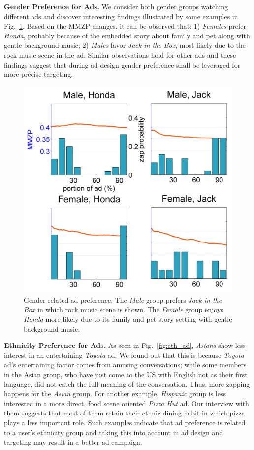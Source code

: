 \documentclass[twoside,leqno,twocolumn]{article}
\begin{document}
\noindent \textbf{Gender Preference for Ads.} We consider both gender groups watching different ads and discover interesting findings illustrated by some examples in Fig.~\ref{fig:ad_gend}. Based on the MMZP changes, it can be observed that: 1) \textit{Females} prefer \textit{Honda}, probably because of the embedded story about family and pet along with gentle background music; 2) \textit{Males} favor \textit{Jack in the Box}, most likely due to the rock music scene in the ad. Similar observations hold for other ads and these findings suggest that during ad design gender preference shall be leveraged for more precise targeting. 

\begin{figure}[h]
	\centering
		\includegraphics[width=.8\columnwidth]{fig/ad_gend.png}
	\caption{Gender-related ad preference. The \textit{Male} group prefers \textit{Jack in the Box} in which rock music scene is shown. The \textit{Female} group enjoys \textit{Honda} more likely due to its family and pet story setting with gentle background music.}
	\label{fig:ad_gend}
\end{figure}

\noindent \textbf{Ethnicity Preference for Ads.} As seen in Fig.~\ref{fig:eth_ad}, \textit{Asians} show less interest in an entertaining \textit{Toyota} ad. We found out that this is because \textit{Toyota} ad's entertaining factor comes from amusing conversations; while some members in the Asian group, who have just come to the US with English not as their first language, did not catch the full meaning of the conversation. Thus, more zapping happens for the \textit{Asian} group. For another example, \textit{Hispanic} group is less interested in a more direct, food scene oriented \textit{Pizza Hut} ad. Our interview with them suggests that most of them retain their ethnic dining habit in which pizza plays a less important role. Such examples indicate that ad preference is related to a user's ethnicity group and taking this into account in ad design and targeting may result in a better ad campaign.
\end{document}
